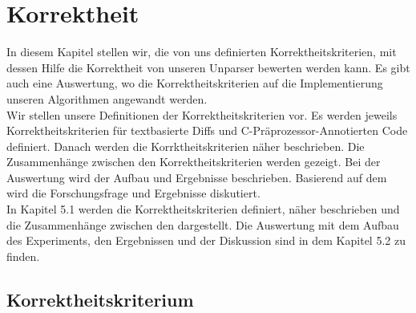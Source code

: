 \chapter{Korrektheit}

In diesem Kapitel stellen wir, die von uns definierten Korrektheitskriterien, mit dessen Hilfe die Korrektheit von unseren Unparser bewerten werden kann. Es gibt auch eine Auswertung, wo die Korrektheitskriterien auf die Implementierung unseren Algorithmen angewandt werden. \\

Wir stellen unsere Definitionen der Korrektheitskriterien vor. Es werden jeweils Korrektheitskriterien für textbasierte Diffs und C-Präprozessor-Annotierten Code definiert. Danach werden die Korrktheitskriterien näher beschrieben. Die Zusammenhänge zwischen den Korrektheitskriterien werden gezeigt. Bei der Auswertung wird der Aufbau und Ergebnisse beschrieben. Basierend auf dem wird die Forschungsfrage und Ergebnisse diskutiert.\\

In Kapitel 5.1 werden die Korrektheitskriterien definiert, näher beschrieben und die Zusammenhänge zwischen den dargestellt. Die Auswertung mit dem Aufbau des Experiments, den Ergebnissen und der Diskussion sind in dem Kapitel 5.2 zu finden.




\section{Korrektheitskriterium}




